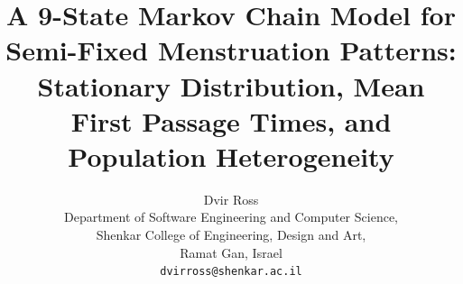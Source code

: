 \documentclass[12pt,a4paper]{article}
\begin{document}
\title{\textbf{A 9-State Markov Chain Model for Semi-Fixed Menstruation Patterns:
Stationary Distribution, Mean First Passage Times, and Population Heterogeneity}}

\author{%
  Dvir Ross\\[4pt]
  \small Department of Software Engineering and Computer Science,\\
  \small Shenkar College of Engineering, Design and Art,\\
  \small Ramat Gan, Israel\\[2pt]
  \small \texttt{dvirross@shenkar.ac.il}
}

\date{}
\maketitle
\end{document}
